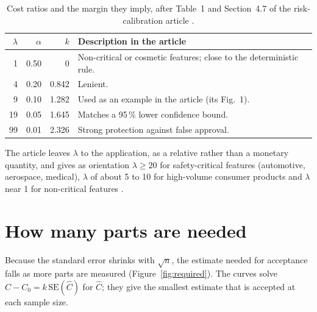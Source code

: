 \documentclass[a4paper,11pt,oneside,openany,parskip=half-,headings=standardclasses,toc=flat,numbers=noenddot]{scrbook}
\newcommand{\thead}[1]{{\sffamily\bfseries\footnotesize #1}}
\newcommand{\figref}[1]{Figure~\ref{#1}}
\begin{document}
\begin{table}[!htp]
\caption{Cost ratios and the margin they imply, after Table~1 and Section~4.7 of the risk-calibration article
\cite{jy-risk}.}\label{tab:lambda}
\small
\begin{tabularx}{\textwidth}{@{}rrrL@{}}
\toprule
\thead{$\lambda$} & \thead{$\alpha$} & \thead{$k$} & \thead{Description in the article}\\
  & 0.50 & 0     & Non-critical or cosmetic features; close to the deterministic rule.\\
4  & 0.20 & 0.842 & Lenient.\\
9  & 0.10 & 1.282 & Used as an example in the article (its Fig.~1).\\
19 & 0.05 & 1.645 & Matches a 95\,\% lower confidence bound.\\
99 & 0.01 & 2.326 & Strong protection against false approval.\\
\bottomrule
\end{tabularx}
\end{table}

The article leaves $\lambda$ to the application, as a relative rather than a monetary quantity, and gives as
orientation $\lambda \ge 20$ for safety-critical features (automotive, aerospace, medical), $\lambda$ of about 5 to
10 for high-volume consumer products and $\lambda$ near 1 for non-critical features \cite[Sec.~4.7]{jy-risk}.

\section{How many parts are needed}\label{sec:sample}

Because the standard error shrinks with $\sqrt n$, the estimate needed for acceptance falls as more parts
are measured (\figref{fig:required}). The curves solve $\widehat C - C_0 = k\,\mathrm{SE}(\widehat C)$ for
$\widehat C$; they give the smallest estimate that is accepted at each sample size.
\end{document}

